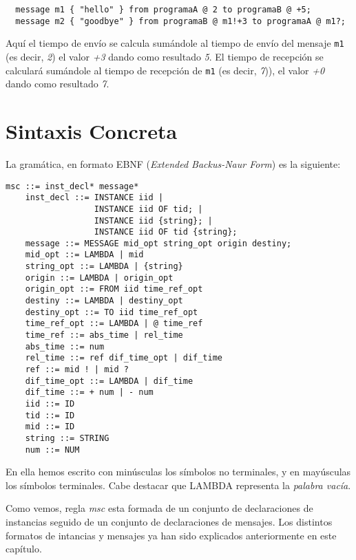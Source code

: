 \begin{itemize}
  \begin{lstlisting}
  message m1 { "hello" } from programaA @ 2 to programaB @ +5;
  message m2 { "goodbye" } from programaB @ m1!+3 to programaA @ m1?;
  \end{lstlisting}

  Aquí el tiempo de envío se calcula sumándole al tiempo de envío del
  mensaje \lstinline{m1} (es decir, \textit{2}) el valor \textit{+3}
  dando como resultado \textit{5}. El tiempo de recepción se calculará
  sumándole al tiempo de recepción de \lstinline{m1} (es decir,
  \textit{7})), el valor \textit{+0} dando como resultado \textit{7}.
\end{itemize}

\section{Sintaxis Concreta}

La gramática, en formato EBNF (\emph{Extended Backus-Naur Form}) es la 
siguiente:
\begin{lstlisting}[style=spec, language={}]
    msc ::= inst_decl* message*
    inst_decl ::= INSTANCE iid |
                  INSTANCE iid OF tid; |
                  INSTANCE iid {string}; |
                  INSTANCE iid OF tid {string};               
    message ::= MESSAGE mid_opt string_opt origin destiny;
    mid_opt ::= LAMBDA | mid
    string_opt ::= LAMBDA | {string}
    origin ::= LAMBDA | origin_opt
    origin_opt ::= FROM iid time_ref_opt
    destiny ::= LAMBDA | destiny_opt
    destiny_opt ::= TO iid time_ref_opt
    time_ref_opt ::= LAMBDA | @ time_ref
    time_ref ::= abs_time | rel_time
    abs_time ::= num
    rel_time ::= ref dif_time_opt | dif_time
    ref ::= mid ! | mid ?
    dif_time_opt ::= LAMBDA | dif_time
    dif_time ::= + num | - num
    iid ::= ID
    tid ::= ID
    mid ::= ID
    string ::= STRING
    num ::= NUM
\end{lstlisting}

En ella hemos escrito con minúsculas los símbolos no terminales, y en 
mayúsculas los símbolos terminales. Cabe destacar que LAMBDA
representa la \textit{palabra vacía}.

Como vemos, regla \textit{msc} esta formada de un conjunto de declaraciones de
instancias seguido de un conjunto de declaraciones de mensajes. Los distintos
formatos de intancias y mensajes ya han sido explicados anteriormente en este
capítulo.


